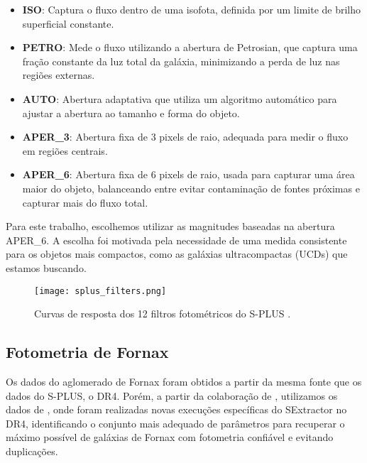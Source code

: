 \begin{itemize}
    \item \textbf{ISO}: Captura o fluxo dentro de uma isofota, definida por um limite de brilho superficial constante.
    \item \textbf{PETRO}: Mede o fluxo utilizando a abertura de Petrosian, que captura uma fração constante da luz total da galáxia, minimizando a perda de luz nas regiões externas.
    \item \textbf{AUTO}: Abertura adaptativa que utiliza um algoritmo automático para ajustar a abertura ao tamanho e forma do objeto.
    \item \textbf{APER\_3}: Abertura fixa de 3 pixels de raio, adequada para medir o fluxo em regiões centrais.
    \item \textbf{APER\_6}: Abertura fixa de 6 pixels de raio, usada para capturar uma área maior do objeto, balanceando entre evitar contaminação de fontes próximas e capturar mais do fluxo total.
\end{itemize}

Para este trabalho, escolhemos utilizar as magnitudes baseadas na abertura APER\_6. A escolha foi motivada pela necessidade de uma medida consistente para os objetos mais compactos, como as galáxias ultracompactas (UCDs) que estamos buscando.

\begin{figure}[!ht]
    \begin{center}
    \texttt{[image: splus\_filters.png]}
    \caption[]{Curvas de resposta dos 12 filtros fotométricos do S-PLUS \citep{splus_DR4_footprint}.}
    \label{splus_filters}
    \end{center}
\end{figure}

\subsection{Fotometria de Fornax}\label{sec:Fornax_data}
Os dados do aglomerado de Fornax foram obtidos a partir da mesma fonte que os dados do S-PLUS, o DR4. Porém, a partir da colaboração de \cite{castelli2024splusfornaxprojectsfp}, utilizamos os dados de \cite{haack2024splusfornaxprojectsfp}, onde foram realizadas novas execuções específicas do SExtractor no DR4, identificando o conjunto mais adequado de parâmetros para recuperar o máximo possível de galáxias de Fornax com fotometria confiável e evitando duplicações.

